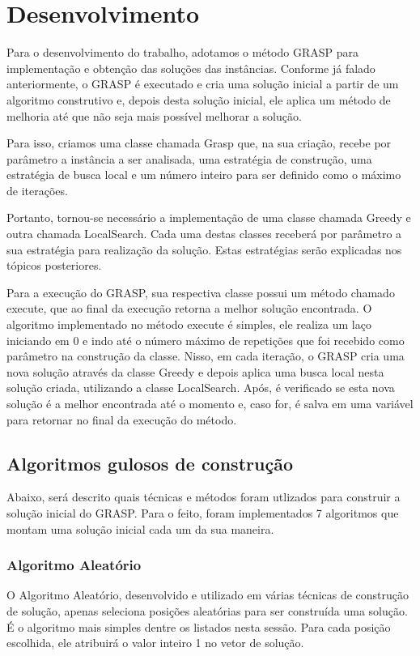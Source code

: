 \documentclass[12pt]{article}
\begin{document}
\section{Desenvolvimento}
Para o desenvolvimento do trabalho, adotamos o método GRASP para implementação e obtenção das soluções das instâncias.
Conforme já falado anteriormente, o GRASP é executado e cria uma solução inicial a partir de um algoritmo construtivo e, depois desta solução inicial, ele aplica um método de melhoria até que não seja mais possível melhorar a solução.

Para isso, criamos uma classe chamada Grasp que, na sua criação, recebe por parâmetro a instância a ser analisada, uma estratégia de construção, uma estratégia de busca local e um número inteiro para ser definido como o máximo de iterações.

Portanto, tornou-se necessário a implementação de uma classe chamada Greedy e outra chamada LocalSearch. Cada uma destas classes receberá por parâmetro a sua estratégia para realização da solução. Estas estratégias serão explicadas nos tópicos posteriores.

Para a execução do GRASP, sua respectiva classe possui um método chamado execute, que ao final da execução retorna a melhor solução encontrada. O algoritmo implementado no método execute é simples, ele realiza um laço iniciando em 0 e indo até o número máximo de repetições que foi recebido como parâmetro na construção da classe. Nisso, em cada iteração, o GRASP cria uma nova solução através da classe Greedy e depois aplica uma busca local nesta solução criada, utilizando a classe LocalSearch. Após, é verificado se esta nova solução é a melhor encontrada até o momento e, caso for, é salva em uma variável para retornar no final da execução do método.

\subsection{Algoritmos gulosos de construção}

Abaixo, será descrito quais técnicas e métodos foram utlizados para construir a solução inicial do GRASP. Para o feito, foram implementados 7 algoritmos que montam uma solução inicial cada um da sua maneira.

\subsubsection{Algoritmo Aleatório}

O Algoritmo Aleatório, desenvolvido e utilizado em várias técnicas de construção de solução, apenas seleciona posições aleatórias para ser construída uma solução. É o algoritmo mais simples dentre os listados nesta sessão. Para cada posição escolhida, ele atribuirá o valor inteiro 1 no vetor de solução.
\end{document}
